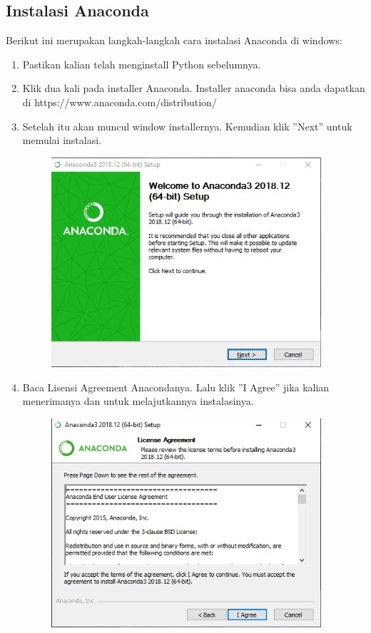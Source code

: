 \subsection{Instalasi Anaconda}
Berikut ini merupakan langkah-langkah cara instalasi Anaconda di windows:
\begin{enumerate}
	\item Pastikan kalian telah menginstall Python sebelumnya.
	\item Klik dua kali pada installer Anaconda. Installer anaconda bisa anda dapatkan di https://www.anaconda.com/distribution/
	\item Setelah itu akan muncul window installernya. Kemudian klik ''Next'' untuk memulai instalasi.
	\begin{figure}[H]
		\includegraphics[width=10cm]{figures/diva/1chp1diva.png}
		\centering
	\end{figure}

	\item Baca Lisensi Agreement Anacondanya. Lalu klik ''I Agree'' jika kalian menerimanya dan untuk melajutkannya instalasinya.
	\begin{figure}[H]
		\includegraphics[width=10cm]{figures/diva/2chp1diva.png}
		\centering
	\end{figure}


\end{enumerate}
